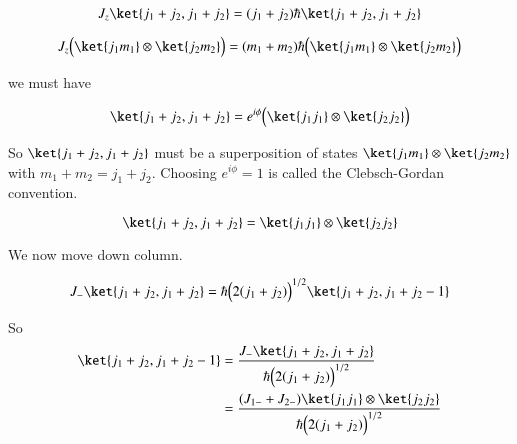 \begin{equation}\label{eqn:qmTwoL17:600}
J_z
\ket{j_1 + j_2, j_1 + j_2}
= 
(j_1 + j_2) \hbar
\ket{j_1 + j_2, j_1 + j_2}
\end{equation}

\begin{equation}\label{eqn:qmTwoL17:620}
J_z 
\Bigl(\ket{j_1 m_1} \otimes \ket{j_2 m_2} \Bigr)
= 
(m_1 + m_2) \hbar
\Bigl(\ket{j_1 m_1} \otimes \ket{j_2 m_2} \Bigr)
\end{equation}

we must have

\begin{equation}\label{eqn:qmTwoL17:640}
\ket{j_1 + j_2, j_1 + j_2}
= e^{i\phi}
\Bigl(\ket{j_1 j_1} \otimes \ket{j_2 j_2} \Bigr)
\end{equation}

So $\ket{j_1 + j_2, j_1 + j_2}$ must be a superposition of states $\ket{j_1 m_1} \otimes \ket{j_2 m_2} $ with $m_1 + m_2 = j_1 + j_2$.  Choosing $e^{i\phi} = 1$ is called the Clebsch-Gordan convention.

\begin{equation}\label{eqn:qmTwoL17:660}
\ket{j_1 + j_2, j_1 + j_2}
= 
\ket{j_1 j_1} \otimes \ket{j_2 j_2}
\end{equation}

We now move down column.

\begin{equation}\label{eqn:qmTwoL17:680}
J_{-} \ket{j_1 + j_2, j_1 + j_2}
=
\hbar
\Bigl(
2 (j_1 + j_2)
\Bigr)^{1/2}
\ket{j_1 + j_2, j_1 + j_2 - 1}
\end{equation}

So 
\begin{align*}
\ket{j_1 + j_2, j_1 + j_2 - 1}
&=
\frac{
J_{-} \ket{j_1 + j_2, j_1 + j_2}
}{
\hbar
\Bigl(
2 (j_1 + j_2)
\Bigr)^{1/2}
} \\
&=
\frac{
(J_{1-} + J_{2-}) \ket{j_1 j_1} \otimes \ket{j_2 j_2}
}{
\hbar
\Bigl(
2 (j_1 + j_2)
\Bigr)^{1/2}
}
\end{align*}

\EndArticle
